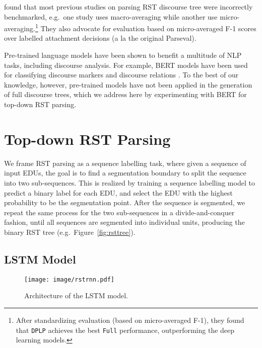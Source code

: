 \documentclass[11pt,a4paper]{article}
\newcommand{\figref}[2][]{Figure#1~\ref{fig:#2}}
\begin{document}
\citet{morey-etal-2017-much} found that most previous studies on parsing
RST discourse tree were incorrectly benchmarked, e.g.\ one study uses
macro-averaging while another use micro-averaging.\footnote{After
  standardizing evaluation (based on micro-averaged F-1), they found
  that \texttt{DPLP} achieves the best \texttt{Full} performance,
  outperforming the deep learning models.} They also advocate for
evaluation based on micro-averaged F-1 scores over labelled attachment
decisions (a la the original Parseval).





Pre-trained language models
\cite{radford2018building,devlin-etal-2019-bert}
have been shown to benefit a multitude of NLP tasks, including discourse analysis.
For example, BERT models have been used for classifying discourse markers
\cite{sileo-etal-2019-mining} and discourse relations
\cite{nie-etal-2019-dissent,shi2019next}. To the best of our knowledge,
however, pre-trained models have not been applied in the generation of
full discourse trees, which we address here by experimenting with BERT
for top-down RST parsing.


\section{Top-down RST Parsing}



We frame RST parsing as a sequence labelling task, where given a
sequence of input EDUs, the goal is to find a segmentation boundary to
split the sequence into two sub-sequences. This is realized by training
a sequence labelling model to predict a binary label for each EDU, and
select the EDU with the highest probability to be the segmentation
point.  After the sequence is segmented, we repeat the same process for
the two sub-sequences in a divide-and-conquer fashion, until all sequences
are segmented into individual units, producing the binary RST tree
(e.g.\ \figref{rsttree}).




\subsection{LSTM Model}
\label{sec:lstm}

\begin{figure}
	\centering
	\texttt{[image: image/rstrnn.pdf]}
    \caption{Architecture of the LSTM model.}
	\label{fig:rstrnn}
\end{figure}
\end{document}
